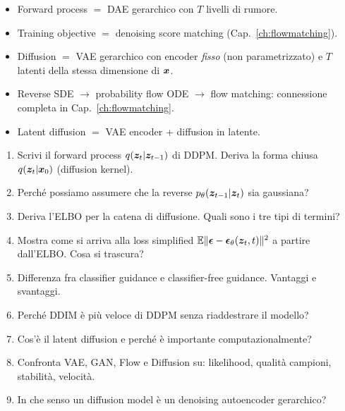 \begin{tcolorbox}[mybox, title={Connessioni}]
\begin{itemize}
  \item Forward process $=$ DAE gerarchico con $T$ livelli di rumore.
  \item Training objective $=$ denoising score matching (Cap.~\ref{ch:flowmatching}).
  \item Diffusion $=$ VAE gerarchico con encoder \emph{fisso} (non parametrizzato) e $T$ latenti della stessa dimensione di $\bm{x}$.
  \item Reverse SDE $\to$ probability flow ODE $\to$ flow matching: connessione completa in Cap.~\ref{ch:flowmatching}.
  \item Latent diffusion $=$ VAE encoder + diffusion in latente.
\end{itemize}
\end{tcolorbox}

\begin{tcolorbox}[mywarn, title={Domande d'esame — Diffusion}]
\begin{enumerate}
  \item Scrivi il forward process $q(\bm{z}_t|\bm{z}_{t-1})$ di DDPM. Deriva la forma chiusa $q(\bm{z}_t|\bm{x}_0)$ (diffusion kernel).
  \item Perché possiamo assumere che la reverse $p_\theta(\bm{z}_{t-1}|\bm{z}_t)$ sia gaussiana?
  \item Deriva l'ELBO per la catena di diffusione. Quali sono i tre tipi di termini?
  \item Mostra come si arriva alla loss simplified $\mathbb{E}\|\boldsymbol{\epsilon} - \boldsymbol{\epsilon}_\theta(\bm{z}_t, t)\|^2$ a partire dall'ELBO. Cosa si trascura?
  \item Differenza fra classifier guidance e classifier-free guidance. Vantaggi e svantaggi.
  \item Perché DDIM è più veloce di DDPM senza riaddestrare il modello?
  \item Cos'è il latent diffusion e perché è importante computazionalmente?
  \item Confronta VAE, GAN, Flow e Diffusion su: likelihood, qualità campioni, stabilità, velocità.
  \item In che senso un diffusion model è un denoising autoencoder gerarchico?
\end{enumerate}
\end{tcolorbox}

